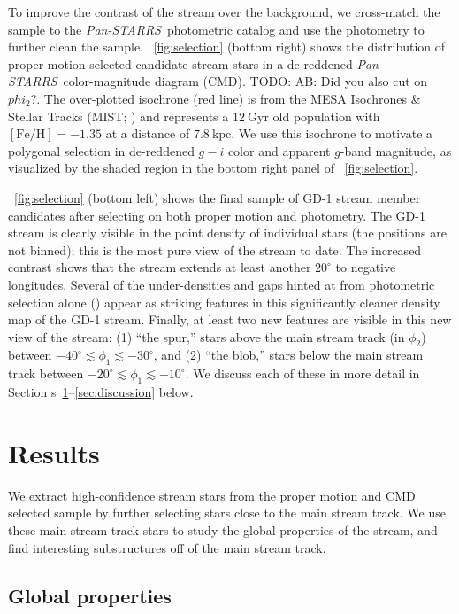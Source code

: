 \documentclass[modern]{aastex62}
\newcommand{\pans}{\textsl{Pan-STARRS}}
\newcommand{\kpc}{\textrm{kpc}}
\newcommand{\feh}{\ensuremath{[\textrm{Fe} / \textrm{H}]}}
\newcommand{\sectionname}{Section}
\newcommand{\todo}[1]{{\color{red} TODO: #1}}
\begin{document}
To improve the contrast of the stream over the background, we cross-match the
sample to the \pans\ photometric catalog and use the photometry to further clean
the sample.
\figurename~\ref{fig:selection} (bottom right) shows the distribution of
proper-motion-selected candidate stream stars in a de-reddened \pans\
color-magnitude diagram (CMD).
\todo{AB: Did you also cut on $phi_2$?}.
The over-plotted isochrone (red line) is from the MESA Isochrones \& Stellar
Tracks (MIST; \citealt{Dotter:2016, Choi:2016, Paxton:2011}) and represents a
$12~\textrm{Gyr}$ old population with $\feh = -1.35$ at a distance of
$7.8~\kpc$.
We use this isochrone to motivate a polygonal selection in de-reddened $g-i$
color and apparent $g$-band magnitude, as visualized by the shaded region in the
bottom right panel of \figurename~\ref{fig:selection}.

\figurename~\ref{fig:selection} (bottom left) shows the final sample of GD-1
stream member candidates after selecting on both proper motion and photometry.
The GD-1 stream is clearly visible in the point density of individual stars (the
positions are not binned); this is the most pure view of the stream to date.
The increased contrast shows that the stream extends at least another $20^\circ$
to negative longitudes.
Several of the under-densities and gaps hinted at from photometric selection
alone (\citealt{Koposov:2010, Carlberg:2013}) appear as striking features in
this significantly cleaner density map of the GD-1 stream.
Finally, at least two new features are visible in this new view of the stream:
(1) ``the spur,'' stars above the main stream track (in $\phi_2$) between
$-40^\circ \lesssim \phi_1 \lesssim -30^\circ$, and (2) ``the blob,'' stars
below the main stream track between $-20^\circ \lesssim \phi_1 \lesssim
-10^\circ$.
We discuss each of these in more detail in \sectionname
s~\ref{sec:results}--\ref{sec:discussion} below.


\section{Results}
\label{sec:results}

We extract high-confidence stream stars from the proper motion and CMD selected
sample by further selecting stars close to the main stream track.
We use these main stream track stars to study the global properties of the
stream, and find interesting substructures off of the main stream track.

\subsection{Global properties}
\label{sec:res_global}
\end{document}
